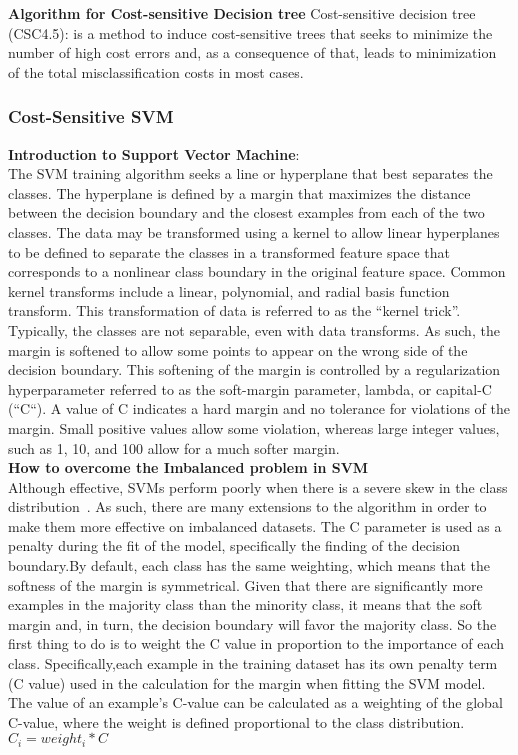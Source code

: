 \noindent
\textbf{Algorithm for Cost-sensitive Decision tree}
Cost-sensitive decision tree (CSC4.5): is a method to induce cost-sensitive trees that seeks to minimize the number of high cost errors and, as a consequence of that, leads to minimization of the total misclassification costs in most cases.



\subsubsection{Cost-Sensitive SVM} 
\textbf{Introduction to Support Vector Machine}:\noindent \\
The SVM training algorithm seeks a line or hyperplane that best separates the classes. The hyperplane is defined by a margin that maximizes the distance between the decision boundary and the closest examples from each of the two classes.
The data may be transformed using a kernel to allow linear hyperplanes to be defined to separate the classes in a transformed feature space that corresponds to a nonlinear class boundary in the original feature space. Common kernel transforms include a linear, polynomial, and radial basis function transform. This transformation of data is referred to as the “kernel trick”.
Typically, the classes are not separable, even with data transforms. As such, the margin is softened to allow some points to appear on the wrong side of the decision boundary. This softening of the margin is controlled by a regularization hyperparameter referred to as the soft-margin parameter, lambda, or capital-C (“C“).
A value of C indicates a hard margin and no tolerance for violations of the margin. Small positive values allow some violation, whereas large integer values, such as 1, 10, and 100 allow for a much softer margin.\noindent \\

\textbf{How to overcome the Imbalanced problem in SVM} \noindent \\
Although effective, SVMs perform poorly when there is a severe skew in the class distribution~\cite{tang2008svms}. As such, there are many extensions to the algorithm in order to make them more effective on imbalanced datasets.
The C parameter is used as a penalty during the fit of the model, specifically the finding of the decision boundary.By default, each class has the same weighting, which means that the softness of the margin is symmetrical.
Given that there are significantly more examples in the majority class than the minority class, it means that the soft margin and, in turn, the decision boundary will favor the majority class.
So the first thing to do is to weight the C value in proportion to the importance of each class.
Specifically,each example in the training dataset has its own penalty term (C value) used in the calculation for the margin when fitting the SVM model. The value of an example’s C-value can be calculated as a weighting of the global C-value, where the weight is defined proportional to the class distribution.\noindent \\
$ C_i = weight_i * C $ \noindent \\

